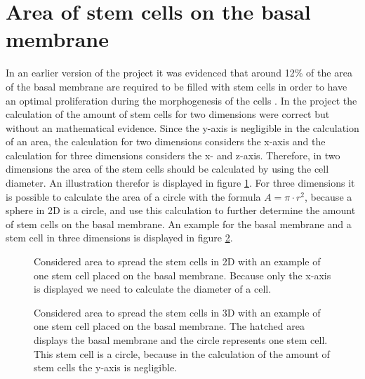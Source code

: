 \section{Area of stem cells on the basal membrane}\label{sec:AmountStemCellsBasalMembrane}
In an earlier version of the project it was evidenced that around 12\% of the area of the basal membrane are required to be filled with stem cells in order to have an optimal proliferation during the morphogenesis of the cells \cite{Torelli2017}.
In the project the calculation of the amount of stem cells for two dimensions were correct but without an mathematical evidence. \newline
Since the y-axis is negligible in the calculation of an area, the calculation for two dimensions considers the x-axis and the calculation for three dimensions considers the x- and z-axis. Therefore, in two dimensions the area of the stem cells should be calculated by using the cell diameter. An illustration therefor is displayed in figure \ref{tikz:AreaIn2D}. For three dimensions it is possible to calculate the area of a circle with the formula $A = \pi \cdot r^{2}$, because a sphere in 2D is a circle, and use this calculation to further determine the amount of stem cells on the basal membrane. An example for the basal membrane and a stem cell in three dimensions is displayed in figure \ref{tikz:AreaIn3D}. 

\begin{figure}[h]
\begin{center}
\caption{Considered area to spread the stem cells in 2D with an example of one stem cell placed on the basal membrane. Because only the x-axis is displayed we need to calculate the diameter of a cell.}
\label{tikz:AreaIn2D}
\end{center}
\end{figure}


\begin{figure}[h]
\begin{center}
\caption{Considered area to spread the stem cells in 3D with an example of one stem cell placed on the basal membrane. The hatched area displays the basal membrane and the circle represents one stem cell. This stem cell is a circle, because in the calculation of the amount of stem cells the y-axis is negligible.}
\label{tikz:AreaIn3D}
\end{center}
\end{figure}


